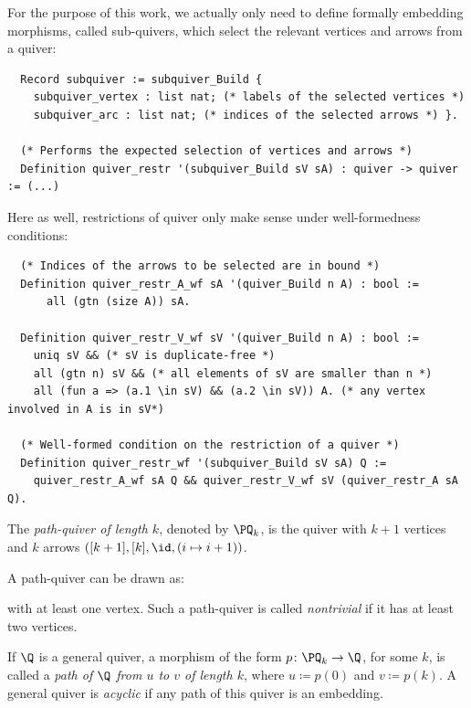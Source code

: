 \documentclass[a4paper,UKenglish,cleveref, autoref, thm-restate]{lipics-v2021}
\begin{document}
For the purpose of this work, we actually only need to define formally embedding morphisms, called sub-quivers, which select the relevant vertices and arrows from a quiver:
\begin{verbatim}
  Record subquiver := subquiver_Build {
    subquiver_vertex : list nat; (* labels of the selected vertices *)
    subquiver_arc : list nat; (* indices of the selected arrows *) }.

  (* Performs the expected selection of vertices and arrows *)
  Definition quiver_restr '(subquiver_Build sV sA) : quiver -> quiver := (...)
\end{verbatim}

Here as well, restrictions of quiver only make sense under well-formedness conditions:
\begin{verbatim}
  (* Indices of the arrows to be selected are in bound *)
  Definition quiver_restr_A_wf sA '(quiver_Build n A) : bool :=
      all (gtn (size A)) sA.

  Definition quiver_restr_V_wf sV '(quiver_Build n A) : bool :=
    uniq sV && (* sV is duplicate-free *)
    all (gtn n) sV && (* all elements of sV are smaller than n *)
    all (fun a => (a.1 \in sV) && (a.2 \in sV)) A. (* any vertex involved in A is in sV*)

  (* Well-formed condition on the restriction of a quiver *)
  Definition quiver_restr_wf '(subquiver_Build sV sA) Q :=
    quiver_restr_A_wf sA Q && quiver_restr_V_wf sV (quiver_restr_A sA Q).
\end{verbatim}

\begin{definition}\label{def:pathquiv}
  The \emph{path-quiver of length $k$}, denoted by $\PQ_k$, is the quiver
  with $k+1$ vertices and $k$ arrows $([k+1], [k], \id, (i \mapsto i + 1))$.
\end{definition}

A path-quiver can be drawn as:
\begin{center} 
\end{center}
with at least one vertex. Such a path-quiver is called \emph{nontrivial} if it has at least two vertices.

If $\Q$ is a general quiver, a morphism of the form $p\colon \PQ_k \to \Q$, for some $k$, is called a \emph{path of\/ $\Q$ from $u$ to $v$ of length $k$}, where $u \coloneqq p(0)$ and $v \coloneqq p(k)$. A general quiver is \emph{acyclic} if any path of this quiver is an embedding.
\end{document}
